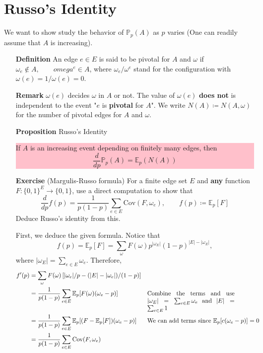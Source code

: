 \documentclass[12pt,a4paper]{report}
\theoremstyle{definition}
\newcommand{\SOL}{\fbox{ \tt s\parbox[b][2pt][c]{6pt}{o}\hspace*{-7pt} L:}}
\begin{document}
\section{Russo's Identity}
We want to show study the behavior of  $\mathbb{P}_p(A)$ as $p$ varies (One can readily assume that $A$ is increasing).
\begin{enumerate}
	\item[\textbf{Definition}] An edge $e \in E$ is said to be pivotal for $A$ and $\omega$ if $\omega_e \notin A, \qquad omega^e \in A$, where $\omega_e / \omega^e$ stand for the configuration with $\omega(e) = 1/\omega(e) = 0$.
	\item[\textbf{Remark}] $\omega(e)$ decides $\omega$ in $A$ or not. The value of $\omega(e)$ \textbf{does not} is independent to the event "$e$ is \textbf{pivotal} for $A$". We write $N(A) \coloneqq N(A,\omega)$ for the number of pivotal edges for $A$ and $\omega$.
	\item[\textbf{Proposition}] Russo's Identity\\
	\colorbox{pink}{
		\begin{minipage}{\textwidth -3cm}
			If $A$ is an increasing event depending on finitely many edges, then 
			$$
	 			\frac{d}{d p} \mathbb{P}_p(A)  = \mathbb{E}_p(N(A))
			$$
		\end{minipage}
	}
	\item[\textbf{Exercise}](Margulis-Russo formula) For a finite edge set $E$ and \textbf{any} function $F : \{0,1\}^E \to \{0,1\}$, use a direct computation to show that 
	 $$
	 \frac{d}{d p} f(p)  = \frac{1}{p(1-p)} \sum_{e \in E} \text{Cov}(F,\omega_e),\qquad f(p) \coloneqq \mathbb{E}_p [F]
	 $$ 
	 Deduce Russo's identity from this.
	\item[\SOL]
		First, we deduce the given formula. 
		Notice that 
		\[
		f(p) = \mathbb{E}_p[F]=\sum_{\omega} F(\omega) p^{|\omega_E|}(1-p)^{|E| - |\omega_E|},
		\] 
		where $|\omega_E| = \sum_{e\in E} \omega_e$.
		Therefore,
		\begin{equation*}
			\begin{aligned}
				f'(p) &= \sum_{\omega}F(\omega)\left[|\omega_e|/p - (|E|-|\omega_e|)/(1-p) \right] 
				   \\ &= \frac{1}{p(1-p)}\sum_{e\in E}\mathbb{E}_p[F(\omega)(\omega_e - p)] && \parbox[t]{5cm}{Combine the terms and use $|\omega_E| = \sum_{e\in E} \omega_e$ and  $|E| = \sum_{e \in E} 1$ }
				   \\ &= \frac{1}{p(1-p)}\sum_{e \in E}\mathbb{E}_p[(F-\mathbb{E}_p[F])(\omega_e - p)] && \text{We can add terms since $\mathbb{E}_p[c(\omega_e - p)] = 0$}
				   \\ &= \frac{1}{p(1-p)}\sum_{e\in E}\text{Cov}(F,\omega_e)
			\end{aligned}
		\end{equation*} 
		

\end{enumerate}
\end{document}
